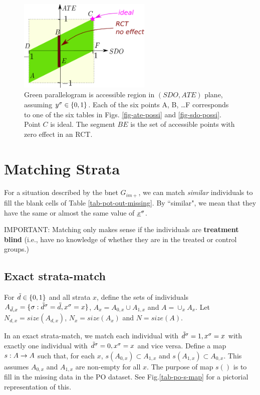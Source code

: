 \begin{figure}[h!]
\centering
\includegraphics[width=2.5in]
{pot-out/sdo-ate-polytope.png}
\caption{
Green parallelogram
is accessible region in
$(SDO,ATE)$ plane,
assuming $y^\sigma\in \{0,1\}$.
Each of the
six points A, B, \ldots F
corresponds to one of the six tables
in Figs. \ref{fig-ate-possi}
and \ref{fig-sdo-possi}.
Point $C$ is ideal.
The segment $BE$
is the set of 
accessible points 
with zero  effect in an RCT. 
} 
\label{fig-sdo-ate-polytope}
\end{figure}



\section{Matching Strata}

For a situation
described by
the bnet $G_{im+}$,
we can match {\it similar}
individuals to fill the blank cells of
 Table \ref{tab-pot-out-missing}.
By ``similar", we mean that
they have the same or almost the same
value of ${\underline{x}}^\sigma$.

IMPORTANT: Matching 
only makes sense 
if the individuals 
are {\bf treatment blind} (i.e., 
have no knowledge
of whether they are
in the treated or control
groups.)


\subsection{Exact strata-match}

For ${\tilde{d}}\in \{0,1\}$ and all strata $x$,
define the sets of individuals
$A_{{\tilde{d}},x}=\{\sigma: {\tilde{d}}^\sigma={\tilde{d}}, x^\sigma=x\}$,
$A_x=A_{0,x}\cup A_{1,x}$ and $A=\cup_x A_x$.
Let $N_{d,x}=size(A_{d,x})$,
$N_x= size(A_x)$ and $N=size(A)$.

In an exact strata-match,
we match each individual with
${\tilde{d}}^\sigma=1, x^\sigma=x$
with
exactly
one individual
with ${\tilde{d}}^\sigma=0, x^\sigma=x$
and vice versa.
Define a map $s:A\rightarrow A$
such that,
for each $x$,
$s(A_{0,x})\subset A_{1,x}$ and
$s(A_{1,x})\subset A_{0,x}$.
This assumes $A_{0,x}$ and $A_{1,x}$
are non-empty for all $x$.
The purpose of map $s()$
is
to fill in the missing data in the
PO dataset. See Fig.\ref{tab-po-s-map}
for a pictorial representation of 
this.

